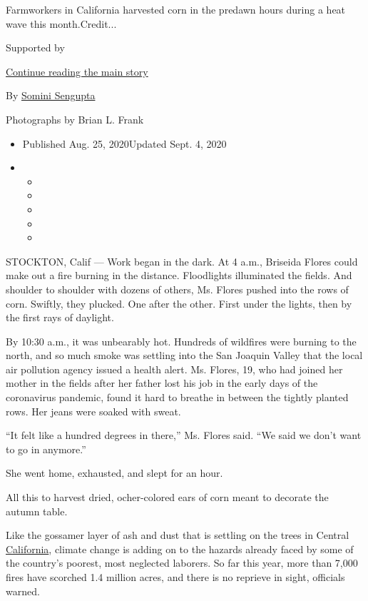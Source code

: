 Farmworkers in California harvested corn in the predawn hours during a
heat wave this month.Credit...

Supported by

\protect\hyperlink{after-sponsor}{Continue reading the main story}

By \href{https://www.nytimes3xbfgragh.onion/by/somini-sengupta}{Somini
Sengupta}

Photographs by Brian L. Frank

\begin{itemize}
\item
  Published Aug. 25, 2020Updated Sept. 4, 2020
\item
  \begin{itemize}
  \item
  \item
  \item
  \item
  \item
  \end{itemize}
\end{itemize}

STOCKTON, Calif --- Work began in the dark. At 4 a.m., Briseida Flores
could make out a fire burning in the distance. Floodlights illuminated
the fields. And shoulder to shoulder with dozens of others, Ms. Flores
pushed into the rows of corn. Swiftly, they plucked. One after the
other. First under the lights, then by the first rays of daylight.

By 10:30 a.m., it was unbearably hot. Hundreds of wildfires were burning
to the north, and so much smoke was settling into the San Joaquin Valley
that the local air pollution agency issued a health alert. Ms. Flores,
19, who had joined her mother in the fields after her father lost his
job in the early days of the coronavirus pandemic, found it hard to
breathe in between the tightly planted rows. Her jeans were soaked with
sweat.

``It felt like a hundred degrees in there,'' Ms. Flores said. ``We said
we don't want to go in anymore.''

She went home, exhausted, and slept for an hour.

All this to harvest dried, ocher-colored ears of corn meant to decorate
the autumn table.

Like the gossamer layer of ash and dust that is settling on the trees in
Central
\href{https://www.nytimes3xbfgragh.onion/2020/09/04/us/california-heat-wave.html}{California},
climate change is adding on to the hazards already faced by some of the
country's poorest, most neglected laborers. So far this year, more than
7,000 fires have scorched 1.4 million acres, and there is no reprieve in
sight, officials warned.

